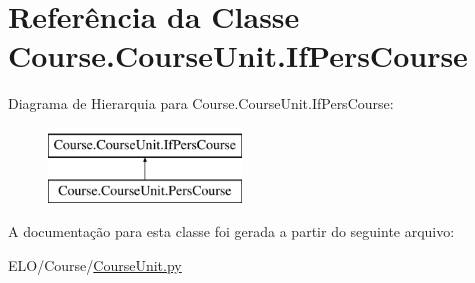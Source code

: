\hypertarget{classCourse_1_1CourseUnit_1_1IfPersCourse}{\section{Referência da Classe Course.\-Course\-Unit.\-If\-Pers\-Course}
\label{classCourse_1_1CourseUnit_1_1IfPersCourse}
}
Diagrama de Hierarquia para Course.\-Course\-Unit.\-If\-Pers\-Course\-:\begin{figure}[H]
\begin{center}
\leavevmode
\includegraphics[height=2.000000cm]{d0/d62/classCourse_1_1CourseUnit_1_1IfPersCourse}
\end{center}
\end{figure}


A documentação para esta classe foi gerada a partir do seguinte arquivo\-:\begin{DoxyCompactItemize}
\item 
E\-L\-O/\-Course/\hyperlink{CourseUnit_8py}{Course\-Unit.\-py}\end{DoxyCompactItemize}
